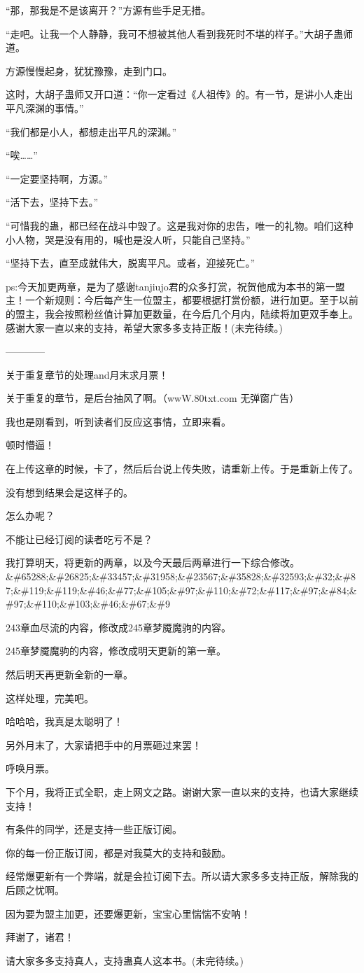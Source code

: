 \begin{this_body}
“那，那我是不是该离开？”方源有些手足无措。

“走吧。让我一个人静静，我可不想被其他人看到我死时不堪的样子。”大胡子蛊师道。

方源慢慢起身，犹犹豫豫，走到门口。

这时，大胡子蛊师又开口道：“你一定看过《人祖传》的。有一节，是讲小人走出平凡深渊的事情。”

“我们都是小人，都想走出平凡的深渊。”

“唉……”

“一定要坚持啊，方源。”

“活下去，坚持下去。”

“可惜我的蛊，都已经在战斗中毁了。这是我对你的忠告，唯一的礼物。咱们这种小人物，哭是没有用的，喊也是没人听，只能自己坚持。”

“坚持下去，直至成就伟大，脱离平凡。或者，迎接死亡。”

ps:今天加更两章，是为了感谢tanjiujo君的众多打赏，祝贺他成为本书的第一盟主！一个新规则：今后每产生一位盟主，都要根据打赏份额，进行加更。至于以前的盟主，我会按照粉丝值计算加更数量，在今后几个月内，陆续将加更双手奉上。感谢大家一直以来的支持，希望大家多多支持正版！(未完待续。)

------------

关于重复章节的处理and月末求月票！

关于重复的章节，是后台抽风了啊。（wwW.80txt.com 无弹窗广告）

我也是刚看到，听到读者们反应这事情，立即来看。

顿时懵逼！

在上传这章的时候，卡了，然后后台说上传失败，请重新上传。于是重新上传了。

没有想到结果会是这样子的。

怎么办呢？

不能让已经订阅的读者吃亏不是？

我打算明天，将更新的两章，以及今天最后两章进行一下综合修改。\&\#65288;\&\#26825;\&\#33457;\&\#31958;\&\#23567;\&\#35828;\&\#32593;\&\#32;\&\#87;\&\#119;\&\#119;\&\#46;\&\#77;\&\#105;\&\#97;\&\#110;\&\#72;\&\#117;\&\#97;\&\#84;\&\#97;\&\#110;\&\#103;\&\#46;\&\#67;\&\#9

243章血尽流的内容，修改成245章梦魇魔驹的内容。

245章梦魇魔驹的内容，修改成明天更新的第一章。

然后明天再更新全新的一章。

这样处理，完美吧。

哈哈哈，我真是太聪明了！

另外月末了，大家请把手中的月票砸过来罢！

呼唤月票。

下个月，我将正式全职，走上网文之路。谢谢大家一直以来的支持，也请大家继续支持！

有条件的同学，还是支持一些正版订阅。

你的每一份正版订阅，都是对我莫大的支持和鼓励。

经常爆更新有一个弊端，就是会拉订阅下去。所以请大家多多支持正版，解除我的后顾之忧啊。

因为要为盟主加更，还要爆更新，宝宝心里惴惴不安呐！

拜谢了，诸君！

请大家多多支持真人，支持蛊真人这本书。(未完待续。)

\end{this_body}

